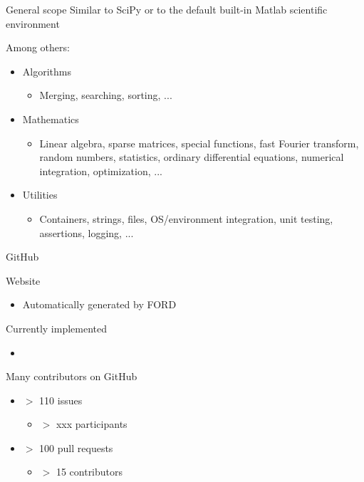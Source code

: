 \documentclass{beamer}
\begin{document}
\begin{frame}[t]{General scope}
	Similar to SciPy or to the default built-in Matlab scientific environment

        Among others:
	\begin{itemize}
		\item Algorithms
		\begin{itemize}
			\item Merging, searching, sorting, ...
		\end{itemize}
		\item Mathematics
		\begin{itemize}
			\item Linear algebra, sparse matrices, special functions, fast Fourier transform, random numbers, statistics, ordinary differential equations, numerical integration, optimization, ...
		\end{itemize}
		\item Utilities
		\begin{itemize}
			\item Containers, strings, files, OS/environment integration, unit testing, assertions, logging, ...
		\end{itemize}
	\end{itemize}
\end{frame}


\begin{frame}[c]{GitHub}
	
\end{frame}


\begin{frame}[c]{Website}
	\begin{itemize}
		\item Automatically generated by FORD %
	\end{itemize}	
\end{frame}


\begin{frame}[c]{Currently implemented}
	\begin{itemize}
		\item 
	\end{itemize}
\end{frame}


\begin{frame}[c]{Many contributors on GitHub}
	\begin{itemize}
		\item $>$ 110 issues
		\begin{itemize}
			\item $>$ xxx participants
		\end{itemize}
		\item $>$ 100 pull requests
		\begin{itemize}
			\item $>$ 15 contributors
		\end{itemize}
	\end{itemize}	
\end{frame}
\end{document}
